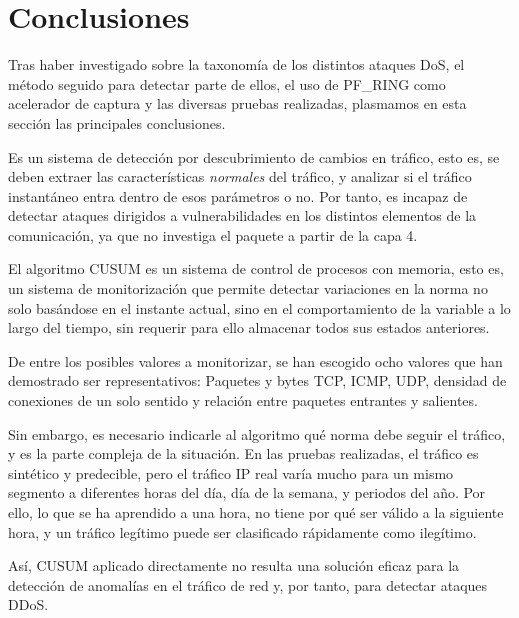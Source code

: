 \section{Conclusiones}

Tras haber investigado sobre la taxonomía de los distintos ataques \gls{DoS}, el método seguido para detectar parte de
ellos, el uso de PF\_RING como acelerador de captura y las diversas 
pruebas realizadas, plasmamos en esta sección las principales conclusiones.

\redborderddos{} Es un sistema de detección por descubrimiento de cambios en tráfico, esto es, se deben extraer 
las características \emph{normales} del tráfico, y analizar si el tráfico instantáneo entra dentro de esos parámetros o 
no. Por tanto, es incapaz de detectar ataques dirigidos a vulnerabilidades en los distintos elementos de la comunicación,
ya que no investiga el paquete a partir de la capa 4.

El algoritmo CUSUM es un sistema de control de procesos con memoria, esto es, un sistema de monitorización que permite 
detectar variaciones en la norma no solo basándose en el instante actual, sino en el comportamiento de la variable a lo 
largo del tiempo, sin requerir para ello almacenar todos sus estados anteriores.

De entre los posibles valores a monitorizar, se han escogido ocho valores que han demostrado ser representativos: 
Paquetes y bytes TCP, ICMP, UDP, densidad de conexiones de un solo sentido y relación entre paquetes entrantes y 
salientes.

Sin embargo, es necesario indicarle al algoritmo qué norma debe seguir el tráfico, y es la parte compleja de la 
situación. En las pruebas realizadas, el tráfico es sintético y predecible, pero el tráfico IP real varía mucho para un 
mismo segmento a diferentes horas del día, día de la semana, y periodos del año. Por ello, lo que se ha aprendido a una 
hora, no tiene por qué ser válido a la siguiente hora, y un tráfico legítimo puede ser clasificado rápidamente como 
ilegítimo. 

Así, CUSUM aplicado directamente no resulta una solución eficaz para la detección de anomalías en el tráfico de red y, 
por tanto, para detectar ataques \gls{DDoS}.

\endinput
